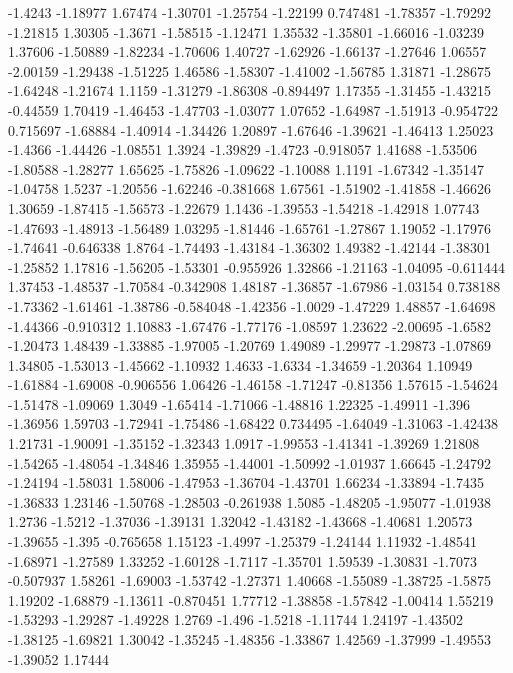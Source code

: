 \documentclass[9pt]{article}
\theoremstyle{plain}
\theoremstyle{definition}
\theoremstyle{remark}
\numberwithin{equation}{section}
\begin{document}
-1.4243
-1.18977
1.67474
-1.30701
-1.25754
-1.22199
0.747481
-1.78357
-1.79292
-1.21815
1.30305
-1.3671
-1.58515
-1.12471
1.35532
-1.35801
-1.66016
-1.03239
1.37606
-1.50889
-1.82234
-1.70606
1.40727
-1.62926
-1.66137
-1.27646
1.06557
-2.00159
-1.29438
-1.51225
1.46586
-1.58307
-1.41002
-1.56785
1.31871
-1.28675
-1.64248
-1.21674
1.1159
-1.31279
-1.86308
-0.894497
1.17355
-1.31455
-1.43215
-0.44559
1.70419
-1.46453
-1.47703
-1.03077
1.07652
-1.64987
-1.51913
-0.954722
0.715697
-1.68884
-1.40914
-1.34426
1.20897
-1.67646
-1.39621
-1.46413
1.25023
-1.4366
-1.44426
-1.08551
1.3924
-1.39829
-1.4723
-0.918057
1.41688
-1.53506
-1.80588
-1.28277
1.65625
-1.75826
-1.09622
-1.10088
1.1191
-1.67342
-1.35147
-1.04758
1.5237
-1.20556
-1.62246
-0.381668
1.67561
-1.51902
-1.41858
-1.46626
1.30659
-1.87415
-1.56573
-1.22679
1.1436
-1.39553
-1.54218
-1.42918
1.07743
-1.47693
-1.48913
-1.56489
1.03295
-1.81446
-1.65761
-1.27867
1.19052
-1.17976
-1.74641
-0.646338
1.8764
-1.74493
-1.43184
-1.36302
1.49382
-1.42144
-1.38301
-1.25852
1.17816
-1.56205
-1.53301
-0.955926
1.32866
-1.21163
-1.04095
-0.611444
1.37453
-1.48537
-1.70584
-0.342908
1.48187
-1.36857
-1.67986
-1.03154
0.738188
-1.73362
-1.61461
-1.38786
-0.584048
-1.42356
-1.0029
-1.47229
1.48857
-1.64698
-1.44366
-0.910312
1.10883
-1.67476
-1.77176
-1.08597
1.23622
-2.00695
-1.6582
-1.20473
1.48439
-1.33885
-1.97005
-1.20769
1.49089
-1.29977
-1.29873
-1.07869
1.34805
-1.53013
-1.45662
-1.10932
1.4633
-1.6334
-1.34659
-1.20364
1.10949
-1.61884
-1.69008
-0.906556
1.06426
-1.46158
-1.71247
-0.81356
1.57615
-1.54624
-1.51478
-1.09069
1.3049
-1.65414
-1.71066
-1.48816
1.22325
-1.49911
-1.396
-1.36956
1.59703
-1.72941
-1.75486
-1.68422
0.734495
-1.64049
-1.31063
-1.42438
1.21731
-1.90091
-1.35152
-1.32343
1.0917
-1.99553
-1.41341
-1.39269
1.21808
-1.54265
-1.48054
-1.34846
1.35955
-1.44001
-1.50992
-1.01937
1.66645
-1.24792
-1.24194
-1.58031
1.58006
-1.47953
-1.36704
-1.43701
1.66234
-1.33894
-1.7435
-1.36833
1.23146
-1.50768
-1.28503
-0.261938
1.5085
-1.48205
-1.95077
-1.01938
1.2736
-1.5212
-1.37036
-1.39131
1.32042
-1.43182
-1.43668
-1.40681
1.20573
-1.39655
-1.395
-0.765658
1.15123
-1.4997
-1.25379
-1.24144
1.11932
-1.48541
-1.68971
-1.27589
1.33252
-1.60128
-1.7117
-1.35701
1.59539
-1.30831
-1.7073
-0.507937
1.58261
-1.69003
-1.53742
-1.27371
1.40668
-1.55089
-1.38725
-1.5875
1.19202
-1.68879
-1.13611
-0.870451
1.77712
-1.38858
-1.57842
-1.00414
1.55219
-1.53293
-1.29287
-1.49228
1.2769
-1.496
-1.5218
-1.11744
1.24197
-1.43502
-1.38125
-1.69821
1.30042
-1.35245
-1.48356
-1.33867
1.42569
-1.37999
-1.49553
-1.39052
1.17444
\end{document}
